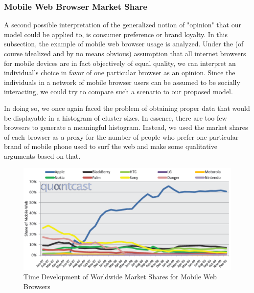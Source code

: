 \documentclass[11pt]{article}
\begin{document}
\subsubsection{Mobile Web Browser Market Share}

A second possible interpretation of the generalized notion of "opinion" that our model could be applied to, is consumer preference or brand loyalty. In this subsection, the example of mobile web browser usage is analyzed. Under the (of course idealized and by no means obvious) assumption that all internet browsers for mobile devices are in fact objectively of equal quality, we can interpret an individual's choice in favor of one particular browser as an opinion. Since the individuals in a network of mobile browser users can be assumed to be socially interacting, we could try to compare such a scenario to our proposed model.

In doing so, we once again faced the problem of obtaining proper data that would be displayable in a histogram of cluster sizes. In essence, there are too few browsers to generate a meaningful histogram. Instead, we used the market shares of each browser as a proxy for the number of people who prefer one particular brand of mobile phone used to surf the web and make some qualitative arguments based on that. \\


\begin{figure}[h!]
  \centering
    \includegraphics[scale=0.6]{Plots/mobile_web.pdf}
  \caption{Time Development of Worldwide Market Shares for Mobile Web Browsers}
  \label{Fig:mobile_web}
\end{figure}
\end{document}
